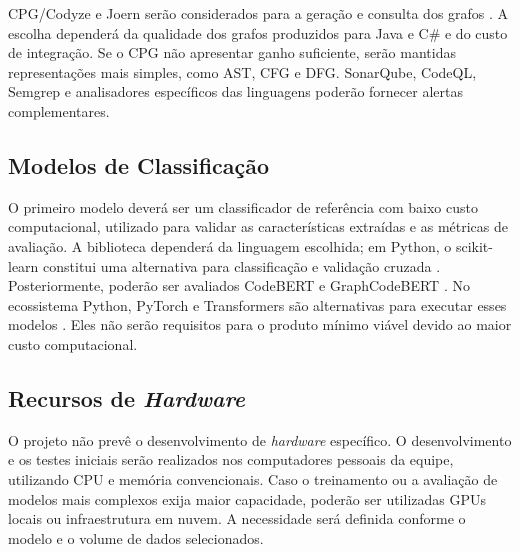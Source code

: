 CPG/Codyze e Joern serão considerados para a geração e consulta dos grafos
\cite{codyze2026,joern2026}. A escolha dependerá da qualidade dos grafos
produzidos para Java e C\# e do custo de integração. Se o CPG não apresentar
ganho suficiente, serão mantidas representações mais simples, como AST,
CFG e DFG. SonarQube, CodeQL, Semgrep e analisadores específicos das
linguagens poderão fornecer alertas complementares.

\subsection{Modelos de Classificação}

O primeiro modelo deverá ser um classificador de referência com baixo
custo computacional, utilizado para validar as características extraídas e
as métricas de avaliação. A biblioteca dependerá da linguagem escolhida;
em Python, o scikit-learn constitui uma alternativa para classificação e
validação cruzada \cite{scikitlearn2026}. Posteriormente, poderão ser avaliados CodeBERT e GraphCodeBERT
\cite{feng2020codebert,guo2021graphcodebert}. No ecossistema Python,
PyTorch e Transformers são alternativas para executar esses modelos
\cite{huggingface2026}. Eles não serão requisitos para o produto mínimo
viável devido ao maior custo computacional.




\subsection{Recursos de \textit{Hardware}}

O projeto não prevê o desenvolvimento de \textit{hardware} específico. O
desenvolvimento e os testes iniciais serão realizados nos computadores
pessoais da equipe, utilizando CPU e memória convencionais. Caso o
treinamento ou a avaliação de modelos mais complexos exija maior capacidade,
poderão ser utilizadas GPUs locais ou infraestrutura em nuvem. A necessidade
será definida conforme o modelo e o volume de dados selecionados.

